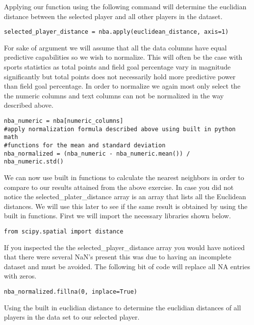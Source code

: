 Applying our function using the following command will determine the
euclidian distance between the selected player and all other players
in the dataset. 

\begin{lstlisting}
selected_player_distance = nba.apply(euclidean_distance, axis=1)
\end{lstlisting} 

For sake of argument we will assume that all the data columns have
equal predictive capabilities so we wish to normalize. This will often
be the case with sports statistics as total points and field goal
percentage vary in magnitude significantly but total points does not
necessarily hold more predictive power than field goal percentage. In
order to normalize we again most only select the the numeric columns
and text columns can not be normalized in the way described above. 


\begin{lstlisting}
nba_numeric = nba[numeric_columns]
#apply normalization formula described above using built in python math
#functions for the mean and standard deviation
nba_normalized = (nba_numeric - nba_numeric.mean()) / nba_numeric.std()
\end{lstlisting} 

We can now use built in functions to calculate the nearest
neighbors in order to compare to our results attained from the above
exercise. In case you did not notice the selected\_plater\_distance
array is an array that lists all the Euclidean distances. We will use
this later to see if the same result is obtained by using the built in
functions. First we will import the necessary libraries shown below. 

 \begin{lstlisting}
from scipy.spatial import distance
\end{lstlisting} 

If you inspected the the selected\_player\_distance array you would have
noticed that there were several NaN's present this was due to having
an incomplete dataset and must be avoided. The following bit of code
will replace all NA entries with zeros. 

 \begin{lstlisting}
nba_normalized.fillna(0, inplace=True)
\end{lstlisting} 

Using the built in euclidian distance to determine the euclidian
distances of all players in the data set to our selected player.

